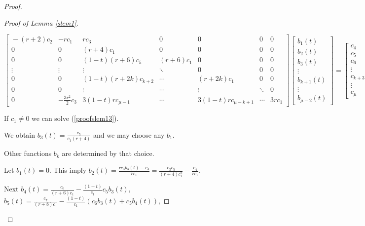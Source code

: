 \documentclass{amsart}
\theoremstyle{definition}
\numberwithin{equation}{section}
\begin{document}
\begin{proof}
\begin{proof}[Proof of Lemma \ref{slem1}]
\setlength{\arraycolsep}{0.1mm}
\begin{small}
\begin{equation}  \label{proofslem13}
\left[ \begin{array}{ccccccc}
\!-(r\!+\!2)c_2 & -rc_1 & rc_3 & 0 & 0 & 0 & 0 \\
0 & 0 & (r+4)c_1 & 0 & 0 & 0 & 0 \\
0 & 0 & (1\!-\!t)(r\!+\!6)c_5 & (r\!+\!6)c_1  & 0 & 0 & 0 \\
\vdots & \vdots & \vdots &  \ddots & 0 & 0 & 0 \\
0 & 0 & (1\!-\!t)(r\!+\!2k)c_{k\!+\!2} & \cdots & (r\!+\!2k)c_1 & 0 & 0 \\
0 & 0 & \vdots & \cdots &\vdots &\ddots & 0 \\
0 & -\frac{3r^2}{2}c_3 & 3(1\!-\!t)rc_{\mu-1} & \cdots & 3(1\!-\!t)rc_{\mu\!-\!k\!+\!1} & \cdots & 3rc_1
\end{array} \right]
\left[ \begin{array}{c} b_1(t) \\ b_2(t) \\ b_3(t) \\\vdots \\ b_{k+1}(t)\\ \vdots \\ b_{\mu-2}(t)  \end{array} \right] =
\left[ \begin{array}{c} c_4 \\ c_5 \\ c_6 \\ \vdots \\ c_{k+3} \\ \vdots \\  c_{\mu}  \end{array}  \right]
\end{equation}
\end{small}

\noindent If \;$c_1\ne 0$ we can solve (\ref{proofslem13}).

\noindent We obtain $b_3(t)=\frac{c_5}{c_1(r+4)}$ and we may choose any $b_1$.

\noindent Other functions $b_k$ are determined by that choice.

 \noindent Let $b_1(t)=0$. This imply $b_2(t)=\frac{rc_3b_3(t)-c_4}{rc_1}=\frac{c_3c_5}{(r+4)c_1^2}-\frac{c_4}{rc_1}$.

  \noindent Next $b_4(t)=\frac{c_6}{(r+6)c_1}-\frac{(1-t)}{c_1}c_5b_3(t)$,  \; $b_5(t)=\frac{c_7}{(r+8)c_1}-\frac{(1-t)}{c_1}(c_6b_3(t)+c_5b_4(t))$,


\end{proof}
\end{proof}
\end{document}
